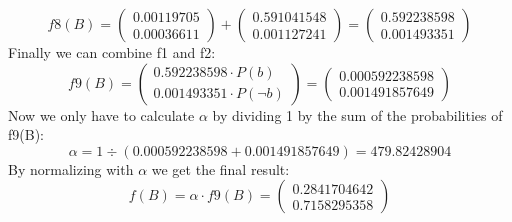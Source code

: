 \documentclass[11pt]{article}
\begin{document}
$$
f8(B) = 
\begin{pmatrix}
  0.00119705 \\
  0.00036611 
\end{pmatrix}
+
\begin{pmatrix}
  0.591041548 \\
  0.001127241 
\end{pmatrix}
=
\begin{pmatrix}
  0.592238598 \\
  0.001493351 
\end{pmatrix}
$$
Finally we can combine f1 and f2:
$$
f9(B) = 
\begin{pmatrix}
  0.592238598 \cdot P(b) \\
  0.001493351 \cdot P(\neg b)
\end{pmatrix}
= 
\begin{pmatrix}
  0.000592238598 \\
  0.001491857649 
\end{pmatrix}
$$
Now we only have to calculate $\alpha$ by dividing 1 by the sum of the probabilities of f9(B):
$$
\alpha = 1 \div (0.000592238598 + 0.001491857649) = 479.82428904
$$
By normalizing with $\alpha$ we get the final result:
$$
f(B) = \alpha \cdot f9(B) = 
\begin{pmatrix}
0.2841704642 \\
0.7158295358
\end{pmatrix}
$$
\end{document}
